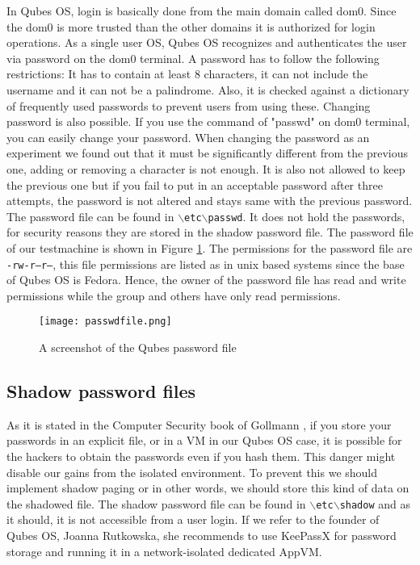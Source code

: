 \documentclass[runningheads,a4paper]{article}
\begin{document}
In Qubes OS, login is basically done
from the main domain called dom0.  Since the dom0 is more trusted than
the other domains it is authorized for login operations.  As a single
user OS, Qubes OS recognizes and authenticates the user via password on
the dom0 terminal. A password has to follow the following restrictions: It has to contain at least 8 characters, it can not include the username and it can not be a palindrome. Also, it is checked against a dictionary of frequently used passwords to prevent users from using these. Changing password is also possible.  If you use
the command of "passwd" on dom0 terminal, you can easily
change your password.  When changing the password as an experiment we found out that it must be significantly different from the previous one, adding or removing a character is not enough. It is also not allowed to keep the previous one but if you fail to put in an acceptable password after three attempts, the password is not altered and stays same with the previous password. The password file can be found in \texttt{$\backslash$etc$\backslash$passwd}. 
It does not hold the passwords, for security reasons they are stored in the shadow password file. The password file of our testmachine is shown in Figure \ref{fig:passwdfile}. The permissions for the password file are \texttt{-rw-r--r--}, this file permissions are listed as in unix based systems since the base of Qubes OS is Fedora. Hence, the owner of the password file has read and write permissions while the group and others have only read permissions.

\begin{figure}[h]
 \centering
 \texttt{[image: passwdfile.png]}
 \caption{A screenshot of the Qubes password file}
 \label{fig:passwdfile}
\end{figure}

\subsection{Shadow password files} 
As it is stated in the Computer Security book of Gollmann
\cite{GollmannComputerSecurity}, if you store your passwords in an
explicit file, or in a VM in our Qubes OS case, it is possible for the
hackers to obtain the passwords even if you hash them.  
This danger might disable our gains from the isolated environment. To prevent this we should implement shadow
paging or in other words, we should store this kind of data on the shadowed file. The shadow password file can be found in \texttt{$\backslash$etc$\backslash$shadow} and as it should, it is not accessible from a user login. If we refer to the founder of Qubes OS, Joanna Rutkowska, she
recommends to use KeePassX for password storage and running it in a network-isolated
dedicated AppVM.  
\end{document}
